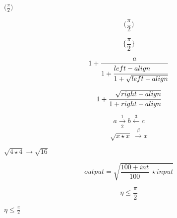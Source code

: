\documentclass{article}
\begin{document}
$\bigl (\frac{\pi}{2}\bigr )$

$$\bigl (\frac{\pi}{2}\bigr )$$

$$\bigl \{\frac{\pi}{2}\bigr \}$$

$$1+\frac{a}{1+\cfrac[l]{left-align}{1 + \sqrt{left-align}}}$$

$$1+\cfrac[r]{\sqrt{right-align}}{1 + right-align}$$

$$a \xrightarrow[2]{1} b \xleftarrow{3} c$$
$$\sqrt{x \star x}~\xrightarrow{\beta} x$$

$\sqrt{4 \star 4}\rightarrow\sqrt{16}$

$$output = \sqrt{\frac{100+int}{100} ~\star input}$$

$$\boxed{\eta \leq \frac{\pi}{2}}$$

$\boxed{\eta \leq \frac{\pi}{2}}$
\end{document}
